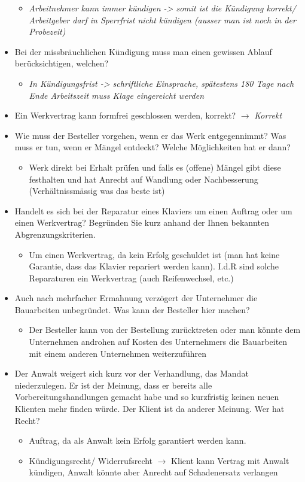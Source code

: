 \begin{itemize}
    \begin{itemize}
        \item \textit{Arbeitnehmer kann immer kündigen -> somit ist die Kündigung korrekt/ Arbeitgeber darf in Sperrfrist nicht kündigen (ausser man ist noch in der Probezeit)}
    \end{itemize}
    \item Bei der missbräuchlichen Kündigung muss man einen gewissen Ablauf berücksichtigen, welchen?
    \begin{itemize}
        \item \textit{In Kündigungsfrist -> schriftliche Einsprache, spätestens 180 Tage nach Ende Arbeitszeit muss Klage eingereicht werden}
    \end{itemize}
    \item Ein Werkvertrag kann formfrei geschlossen werden, korrekt? $\rightarrow$ \textit{Korrekt}
    \item Wie muss der Besteller vorgehen, wenn er das Werk entgegennimmt? Was muss er tun, wenn er Mängel entdeckt? Welche Möglichkeiten hat er dann?
    \begin{itemize}
        \item Werk direkt bei Erhalt prüfen und falls es (offene) Mängel gibt diese festhalten und hat Anrecht auf Wandlung oder Nachbesserung (Verhältnissmässig was das beste ist)
    \end{itemize}
    \item Handelt es sich bei der Reparatur eines Klaviers um einen Auftrag oder um einen Werkvertrag? Begründen Sie kurz anhand der Ihnen bekannten Abgrenzungskriterien.
    \begin{itemize}
        \item Um einen Werkvertrag, da kein Erfolg geschuldet ist (man hat keine Garantie, dass das Klavier repariert werden kann). I.d.R sind solche Reparaturen ein Werkvertrag (auch Reifenwechsel, etc.)
    \end{itemize}
    \item Auch nach mehrfacher Ermahnung verzögert der Unternehmer die Bauarbeiten unbegründet. Was kann der Besteller hier machen?
    \begin{itemize}
        \item Der Besteller kann von der Bestellung zurücktreten oder man könnte dem Unternehmen androhen auf Kosten des Unternehmers die Bauarbeiten mit einem anderen Unternehmen weiterzuführen
    \end{itemize}
    \item Der Anwalt weigert sich kurz vor der Verhandlung, das Mandat niederzulegen. Er ist der Meinung, dass er bereits alle Vorbereitungshandlungen gemacht habe und so kurzfristig keinen neuen Klienten mehr finden würde. Der Klient ist da anderer Meinung. Wer hat Recht?
    \begin{itemize}
        \item Auftrag, da als Anwalt kein Erfolg garantiert werden kann.
        \item Kündigungsrecht/ Widerrufsrecht $\rightarrow$ Klient kann Vertrag mit Anwalt kündigen, Anwalt könnte aber Anrecht auf Schadenersatz verlangen
    \end{itemize}
\end{itemize}

